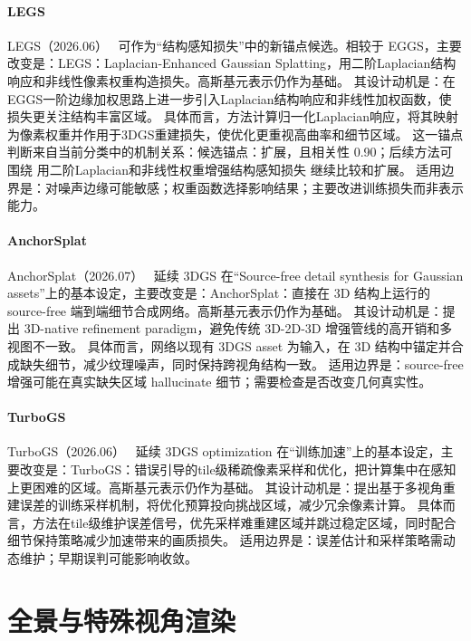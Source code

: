 \paragraph{LEGS}
LEGS（2026.06）~\cite{2606_07932} 可作为“结构感知损失”中的新锚点候选。相较于 EGGS，主要改变是：LEGS：Laplacian-Enhanced Gaussian Splatting，用二阶Laplacian结构响应和非线性像素权重构造损失。高斯基元表示仍作为基础。
其设计动机是：在EGGS一阶边缘加权思路上进一步引入Laplacian结构响应和非线性加权函数，使损失更关注结构丰富区域。
具体而言，方法计算归一化Laplacian响应，将其映射为像素权重并作用于3DGS重建损失，使优化更重视高曲率和细节区域。
这一锚点判断来自当前分类中的机制关系：候选锚点：扩展，且相关性 0.90；后续方法可围绕 用二阶Laplacian和非线性权重增强结构感知损失 继续比较和扩展。
适用边界是：对噪声边缘可能敏感；权重函数选择影响结果；主要改进训练损失而非表示能力。

\paragraph{AnchorSplat}
AnchorSplat（2026.07）~\cite{2607_01290} 延续 3DGS 在“Source-free detail synthesis for Gaussian assets”上的基本设定，主要改变是：AnchorSplat：直接在 3D 结构上运行的 source-free 端到端细节合成网络。高斯基元表示仍作为基础。
其设计动机是：提出 3D-native refinement paradigm，避免传统 3D-2D-3D 增强管线的高开销和多视图不一致。
具体而言，网络以现有 3DGS asset 为输入，在 3D 结构中锚定并合成缺失细节，减少纹理噪声，同时保持跨视角结构一致。
适用边界是：source-free 增强可能在真实缺失区域 hallucinate 细节；需要检查是否改变几何真实性。

\paragraph{TurboGS}
TurboGS（2026.06）~\cite{2606_15924} 延续 3DGS optimization 在“训练加速”上的基本设定，主要改变是：TurboGS：错误引导的tile级稀疏像素采样和优化，把计算集中在感知上更困难的区域。高斯基元表示仍作为基础。
其设计动机是：提出基于多视角重建误差的训练采样机制，将优化预算投向挑战区域，减少冗余像素计算。
具体而言，方法在tile级维护误差信号，优先采样难重建区域并跳过稳定区域，同时配合细节保持策略减少加速带来的画质损失。
适用边界是：误差估计和采样策略需动态维护；早期误判可能影响收敛。
\section{全景与特殊视角渲染}
\label{sec:02_4}

